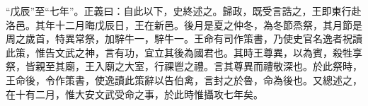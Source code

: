 {\noindent\shu{}\fzkt “戊辰”至“七年”。正義曰：自此以下，史終述之。歸政，既受言誥之，王即東行赴洛邑。其年十二月晦戊辰日，王在新邑。後月是夏之仲冬，為冬節烝祭，其月節是周之歲首，特異常祭，加騂牛一，騂牛一。王命有司作策書，乃使史官名逸者祝讀此策，惟告文武之神，言有功，宜立其後為國君也。其時王尊異，以為賓，殺牲享祭，皆親至其廟，王入廟之大室，行祼鬯之禮。言其尊異而禮敬深也。於此祭時，王命後，令作策書，使逸讀此策辭以告伯禽，言封之於魯，命為後也。又總述之，在十有二月，惟大安文武受命之事，於此時惟攝攻七年矣。 \par}

